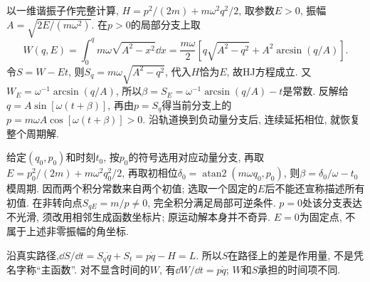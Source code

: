 以一维谐振子作完整计算, $H=p^2/(2m)+m\omega^2q^2/2$, 取参数$E>0$, 振幅$A=\sqrt{2E/(m\omega^2)}$. 在$p>0$的局部分支上取
\[
W(q,E)=\int_0^q m\omega\sqrt{A^2-x^2}\dd x
=\frac{m\omega}{2}\left[q\sqrt{A^2-q^2}+A^2\arcsin(q/A)\right].
\]
令$S=W-Et$, 则$S_q=m\omega\sqrt{A^2-q^2}$, 代入$H$恰为$E$, 故HJ方程成立. 又$W_E=\omega^{-1}\arcsin(q/A)$, 所以$\beta=S_E=\omega^{-1}\arcsin(q/A)-t$是常数. 反解给$q=A\sin[\omega(t+\beta)]$, 再由$p=S_q$得当前分支上的$p=m\omega A\cos[\omega(t+\beta)]>0$. 沿轨道换到负动量分支后, 连续延拓相位, 就恢复整个周期解.

给定$(q_0,p_0)$和时刻$t_0$, 按$p_0$的符号选用对应动量分支, 再取$E=p_0^2/(2m)+m\omega^2q_0^2/2$, 再取初相位$\delta_0=\operatorname{atan2}(m\omega q_0,p_0)$, 则$\beta=\delta_0/\omega-t_0$模周期. 因而两个积分常数来自两个初值; 选取一个固定的$E$后不能还宣称描述所有初值. 在非转向点$S_{qE}=m/p\ne0$, 完全积分满足局部可逆条件. $p=0$处该分支表达不光滑, 须改用相邻生成函数坐标片; 原运动解本身并不奇异. $E=0$为固定点, 不属于上述非零振幅的角坐标.

沿真实路径,$\dd S/\dd t=S_q\dot q+S_t=p\dot q-H=L$. 所以$S$在路径上的差是作用量, 不是凭名字称“主函数”. 对不显含时间的$W$, 有$\dd W/\dd t=p\dot q$; $W$和$S$承担的时间项不同.
